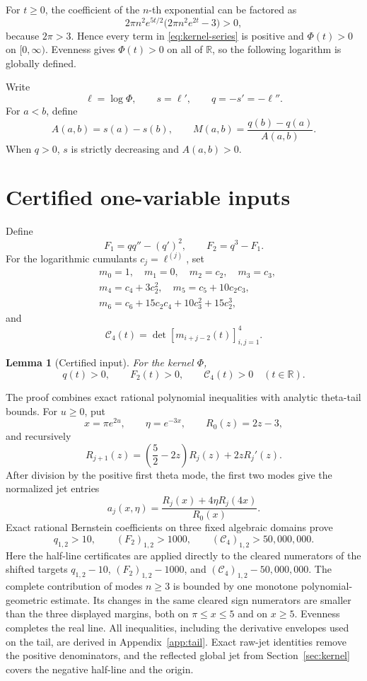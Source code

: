 \documentclass[11pt]{article}
\newtheorem{lemma}[theorem]{Lemma}
\theoremstyle{remark}
\newcommand{\R}{\mathbb{R}}
\newcommand{\Cfour}{\mathcal{C}_4}
\newcommand{\secref}[1]{Section~\ref{#1}}
\newcommand{\appref}[1]{Appendix~\ref{#1}}
\numberwithin{equation}{section}
\begin{document}
For \(t\geq0\), the coefficient of the \(n\)-th exponential can be factored as
\[
 2\pi n^2e^{5t/2}\bigl(2\pi n^2e^{2t}-3\bigr)>0,
\]
because \(2\pi>3\). Hence every term in \eqref{eq:kernel-series} is positive
and \(\Phi(t)>0\) on \([0,\infty)\). Evenness gives \(\Phi(t)>0\) on all of
\(\R\), so the following logarithm is globally defined.

Write
\[
 \ell=\log\Phi,\qquad s=\ell',\qquad q=-s'=-\ell''.
\]
For \(a<b\), define
\begin{equation}\label{eq:AM}
 A(a,b)=s(a)-s(b),\qquad
 M(a,b)=\frac{q(b)-q(a)}{A(a,b)}.
\end{equation}
When \(q>0\), \(s\) is strictly decreasing and \(A(a,b)>0\).
\section{Certified one-variable inputs}\label{sec:inputs}

Define
\[
 F_1=qq''-(q')^2,\qquad F_2=q^3-F_1.
\]
For the logarithmic cumulants \(c_j=\ell^{(j)}\), set
\[
\begin{aligned}
 &m_0=1,\quad m_1=0,\quad m_2=c_2,\quad m_3=c_3,\\
 &m_4=c_4+3c_2^2,\quad m_5=c_5+10c_2c_3,\\
 &m_6=c_6+15c_2c_4+10c_3^2+15c_2^3,
\end{aligned}
\]
and
\begin{equation}\label{eq:C4-def}
 \Cfour(t)=\det[m_{i+j-2}(t)]_{i,j=1}^4.
\end{equation}

\begin{lemma}[Certified input]\label{lem:certified-input}
For the kernel \(\Phi\),
\[
 q(t)>0,\qquad F_2(t)>0,\qquad \Cfour(t)>0
 \quad(t\in\R).
\]
\end{lemma}

The proof combines exact rational polynomial inequalities with analytic
theta-tail bounds. For \(u\geq0\), put
\[
 x=\pi e^{2u},\qquad \eta=e^{-3x},\qquad R_0(z)=2z-3,
\]
and recursively
\[
 R_{j+1}(z)=\left(\frac52-2z\right)R_j(z)+2zR_j'(z).
\]
After division by the positive first theta mode, the first two modes give the
normalized jet entries
\[
 a_j(x,\eta)=\frac{R_j(x)+4\eta R_j(4x)}{R_0(x)}.
\]
Exact rational Bernstein coefficients on three fixed algebraic domains prove
\[
 q_{1,2}>10,\qquad (F_2)_{1,2}>1000,
 \qquad (\Cfour)_{1,2}>50{,}000{,}000.
\]
Here the half-line certificates are applied directly to the cleared
numerators of the shifted targets \(q_{1,2}-10\),
\((F_2)_{1,2}-1000\), and
\((\Cfour)_{1,2}-50{,}000{,}000\). The complete contribution of modes
\(n\geq3\) is bounded by one monotone polynomial-geometric estimate. Its
changes in the same cleared sign numerators are smaller than the three
displayed margins, both on
\(\pi\leq x\leq5\) and on \(x\geq5\). Evenness completes the real line.
All inequalities, including the derivative envelopes used on the tail, are
derived in \appref{app:tail}. Exact raw-jet identities remove the positive
denominators, and the reflected global jet from \secref{sec:kernel} covers the
negative half-line and the origin.
\end{document}
